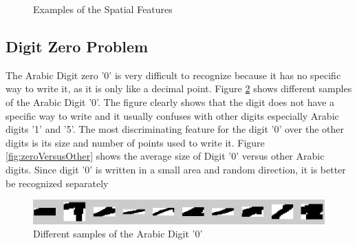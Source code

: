 \documentclass[10pt]{IEEEtran}
\begin{document}
\begin{figure}[h]
\centering
 \caption{Examples of the Spatial Features}
 \label{fig:features}
\end{figure}


\subsection{Digit Zero Problem}
\label{sec:ZeroProblem}



The Arabic Digit zero '0' is very difficult to recognize because it has no specific way to write it, as it is only like a decimal point. Figure \ref{fig:zerosize} shows different samples of the Arabic Digit '0'. The figure clearly shows that the digit does not have a specific way to write and it usually confuses with other digits especially Arabic digits '1' and '5'. The most discriminating feature for the digit '0' over the other digits is its size and number of points used to write it. Figure \ref{fig:zeroVersusOther} shows the average size of Digit '0' versus other Arabic digits. Since digit '0' is written in a small area and random direction, it is better be recognized separately




 \begin{figure}
	\centering
		\includegraphics[scale=0.35]{Zero0}
	\caption[Arabic '0' Digits ] {Different samples of the Arabic Digit '0'}
	\label{fig:zerosize}
\end{figure}
\end{document}
